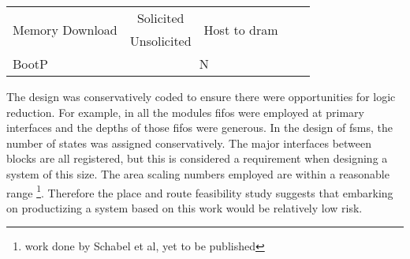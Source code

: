 \begin{table}[h]
\begin{minipage}{1\textwidth}
\begin{tabular}{ |m{4cm}|c|c|c|m{3cm}|}
 \multirow{2}{*}{Memory Download}       &   Solicited   & \multirow{2}{*}{Host to \ac{dram}} &                         &                                                                        \\\cline{2-2}
                                        &   Unsolicited &                                    &                         &                                                                        \\\cline{1-3}
        BootP                           &   \multicolumn{2}{c|}{N}                           &                         &                                                                        \\\cline{1-5}
          \end{tabular}
  \end{minipage}
  \captionsetup{justification=centering, skip=9pt}
  \vspace{0.0cm}
  \label{tab:Features implemented}
\end{table}

The design was conservatively coded to ensure there were opportunities for logic reduction. For example, in all the modules \acp{fifo} were employed at primary interfaces and the depths of those \acp{fifo} were generous.
In the design of \acp{fsm}, the number of states was assigned conservatively.
The major interfaces between blocks are all registered, but this is considered a requirement when designing a system of this size.
The area scaling numbers employed are within a reasonable range \cite{schabel2017energy}\footnote{work done by Schabel et al, yet to be published}.
Therefore the place and route feasibility study suggests that embarking on productizing a system based on this work would be relatively low risk.

